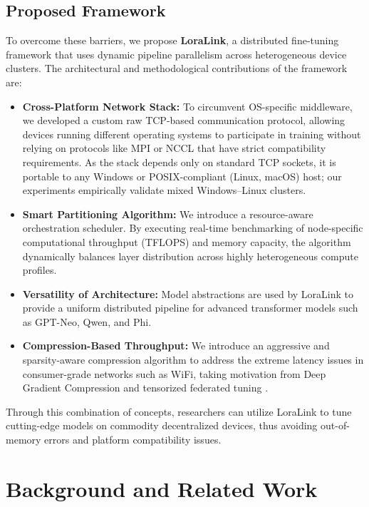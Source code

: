 \documentclass{ieeeaccess}
\begin{document}
\subsection{Proposed Framework}
To overcome these barriers, we propose \textbf{LoraLink}, a distributed fine-tuning framework that uses dynamic pipeline parallelism across heterogeneous device clusters. The architectural and methodological contributions of the framework are:

\begin{itemize}
    \item \textbf{Cross-Platform Network Stack:} To circumvent OS-specific middleware, we developed a custom raw TCP-based communication protocol, allowing devices running different operating systems to participate in training without relying on protocols like MPI or NCCL that have strict compatibility requirements. As the stack depends only on standard TCP sockets, it is portable to any Windows or POSIX-compliant (Linux, macOS) host; our experiments empirically validate mixed Windows--Linux clusters.
    \item \textbf{Smart Partitioning Algorithm:} We introduce a resource-aware orchestration scheduler. By executing real-time benchmarking of node-specific computational throughput (TFLOPS) and memory capacity, the algorithm dynamically balances layer distribution across highly heterogeneous compute profiles.
    \item \textbf{Versatility of Architecture:} Model abstractions are used by LoraLink to provide a uniform distributed pipeline for advanced transformer models such as GPT-Neo, Qwen, and Phi.
    \item \textbf{Compression-Based Throughput:} We introduce an aggressive and sparsity-aware compression algorithm to address the extreme latency issues in consumer-grade networks such as WiFi, taking motivation from Deep Gradient Compression \cite{lin2018deep} and tensorized federated tuning \cite{ghiasvand2024communication}.
\end{itemize}

Through this combination of concepts, researchers can utilize LoraLink to tune cutting-edge models on commodity decentralized devices, thus avoiding out-of-memory errors and platform compatibility issues.

\section{Background and Related Work}
\end{document}
